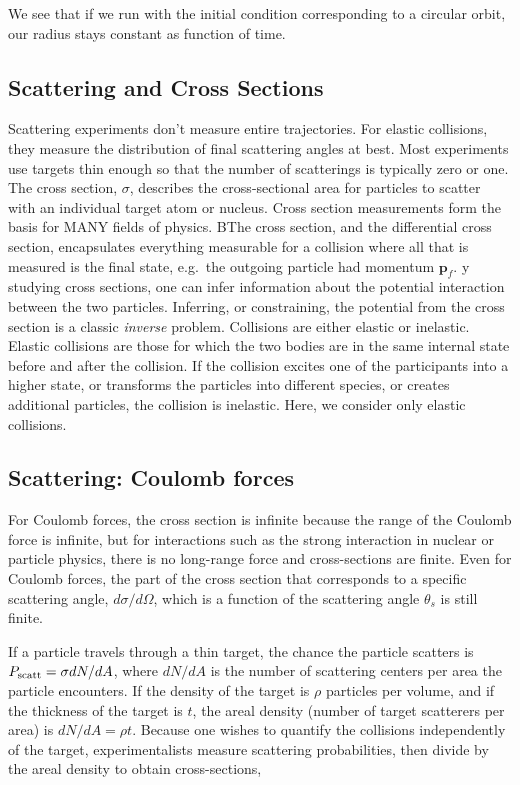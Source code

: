 \documentclass[%
oneside,                 %
final,                   %
10pt]{article}
\begin{document}
We see that if we run with the initial condition corresponding to a circular orbit, our radius stays constant as function of time. 

\subsection*{Scattering and Cross Sections}

Scattering experiments don't measure entire trajectories. For elastic
collisions, they measure the distribution of final scattering angles
at best. Most experiments use targets thin enough so that the number
of scatterings is typically zero or one. The cross section, $\sigma$,
describes the cross-sectional area for particles to scatter with an
individual target atom or nucleus. Cross section measurements form the
basis for MANY fields of physics. BThe cross section, and the
differential cross section, encapsulates everything measurable for a
collision where all that is measured is the final state, e.g.~the
outgoing particle had momentum $\bm{p}_f$. y studying cross sections,
one can infer information about the potential interaction between the
two particles. Inferring, or constraining, the potential from the
cross section is a classic {\it inverse} problem. Collisions are
either elastic or inelastic. Elastic collisions are those for which
the two bodies are in the same internal state before and after the
collision. If the collision excites one of the participants into a
higher state, or transforms the particles into different species, or
creates additional particles, the collision is inelastic. Here, we
consider only elastic collisions.

\subsection*{Scattering: Coulomb forces}

For Coulomb forces, the cross section is infinite because the range of
the Coulomb force is infinite, but for interactions such as the strong
interaction in nuclear or particle physics, there is no long-range
force and cross-sections are finite. Even for Coulomb forces, the part
of the cross section that corresponds to a specific scattering angle,
$d\sigma/d\Omega$, which is a function of the scattering angle
$\theta_s$ is still finite.

If a particle travels through a thin target, the chance the particle
scatters is $P_{\rm scatt}=\sigma dN/dA$, where $dN/dA$ is the number
of scattering centers per area the particle encounters. If the density
of the target is $\rho$ particles per volume, and if the thickness of
the target is $t$, the areal density (number of target scatterers per
area) is $dN/dA=\rho t$. Because one wishes to quantify the collisions
independently of the target, experimentalists measure scattering
probabilities, then divide by the areal density to obtain
cross-sections,
\end{document}

